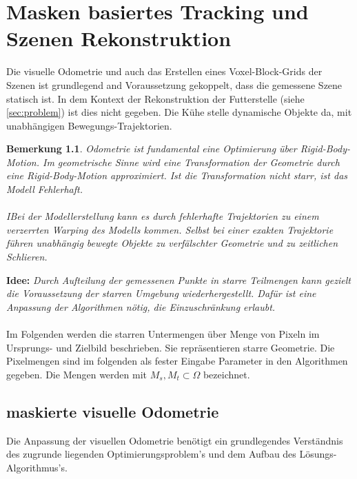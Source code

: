 \documentclass[12pt,DIV=15,BCOR=15mm,twoside,headsepline,abstract=true,listof=totoc,bibliography=totoc]{scrreprt}
\newtheorem{remark}{Bemerkung}[chapter]
\theoremstyle{remark}    %
\begin{document}
    \chapter{Masken basiertes Tracking und Szenen Rekonstruktion} \label{kap:maskout}
    Die visuelle Odometrie und auch das Erstellen eines Voxel-Block-Grids der Szenen ist grundlegend and Voraussetzung gekoppelt, dass die gemessene Szene statisch ist. 
    In dem Kontext der Rekonstruktion der Futterstelle (siehe \ref{sec:problem}) ist dies nicht gegeben. Die Kühe stelle dynamische Objekte da, mit unabhängigen
    Bewegungs-Trajektorien.
    \begin{remark}\noindent
    Odometrie ist fundamental eine Optimierung über Rigid-Body-Motion. Im geometrische Sinne wird eine Transformation
    der Geometrie durch eine Rigid-Body-Motion approximiert. Ist die Transformation nicht starr, ist das Modell Fehlerhaft.\\\\
    IBei der Modellerstellung kann es durch fehlerhafte Trajektorien zu einem verzerrten Warping des Modells kommen. Selbst bei einer exakten 
    Trajektorie führen unabhängig bewegte Objekte zu verfälschter Geometrie und zu zeitlichen Schlieren.
    \end{remark}
    \textbf{Idee:} \emph{Durch Aufteilung der gemessenen Punkte in starre Teilmengen kann gezielt die Voraussetzung der starren Umgebung wiederhergestellt.
    Dafür ist eine Anpassung der Algorithmen nötig, die Einzuschränkung erlaubt.}\\\\
    Im Folgenden werden die starren Untermengen über Menge von Pixeln im Ursprungs- und Zielbild beschrieben. Sie repräsentieren starre Geometrie. 
    Die Pixelmengen sind im folgenden als fester Eingabe Parameter in den Algorithmen gegeben. Die Mengen werden mit $M_s, M_t \subset \Omega$ bezeichnet.

    \section{maskierte visuelle Odometrie}
    Die Anpassung der visuellen Odometrie benötigt ein grundlegendes Verständnis des zugrunde liegenden Optimierungsproblem's  und dem Aufbau des 
    Lösungs-Algorithmus's.
\end{document}

